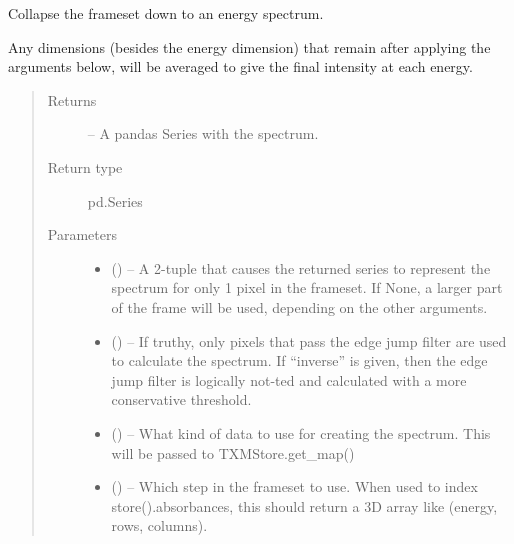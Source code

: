 \documentclass[letterpaper,10pt,english]{sphinxmanual}
\begin{document}
\begin{fulllineitems}
\begin{fulllineitems}
\end{fulllineitems}


\begin{fulllineitems}
\label{\detokenize{xanespy:xanespy.xanes_frameset.XanesFrameset.spectrum}}
Collapse the frameset down to an energy spectrum.

Any dimensions (besides the energy dimension) that remain
after applying the arguments below, will be averaged to give
the final intensity at each energy.
\begin{quote}\begin{description}
\item[{Returns}] \leavevmode
{} -- A pandas Series with the spectrum.

\item[{Return type}] \leavevmode
pd.Series

\item[{Parameters}] \leavevmode\begin{itemize}
\item {} 
 (\sphinxstyleliteralemphasis{, }) -- A 2-tuple that causes the returned series to represent
the spectrum for only 1 pixel in the frameset. If None, a
larger part of the frame will be used, depending on the
other arguments.

\item {} 
 (\sphinxstyleliteralemphasis{, }) -- If truthy, only pixels that
pass the edge jump filter are used to calculate the
spectrum. If ``inverse'' is given, then the edge jump filter
is logically not-ted and calculated with a more
conservative threshold.

\item {} 
 (\sphinxstyleliteralemphasis{, }) -- What kind of data to use for creating the spectrum. This
will be passed to TXMStore.get\_map()

\item {} 
 (\sphinxstyleliteralemphasis{, }) -- Which step in the frameset to use. When used to index
store().absorbances, this should return a 3D array like
(energy, rows, columns).


\end{itemize}
\end{description}
\end{quote}
\end{fulllineitems}
\end{fulllineitems}
\end{document}
